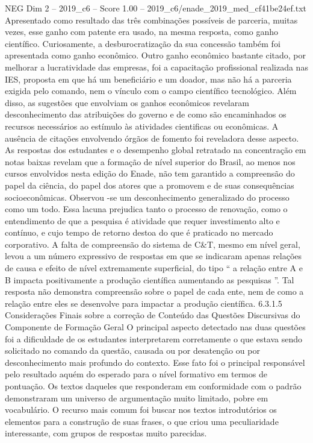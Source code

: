 \begin{textsample}{NEG Dim 2 – 2019\_c6 – Score 1.00 – 2019\_c6/enade\_2019\_med\_cf41be24ef.txt}
Apresentado como resultado das três combinações possíveis de parceria, muitas vezes, esse ganho com patente era usado, na mesma resposta, como ganho científico.
Curiosamente, a desburocratização da sua concessão também foi apresentada como ganho econômico.
Outro ganho econômico bastante citado, por melhorar a lucratividade das empresas, foi a capacitação profissional realizada nas IES, proposta em que há um beneficiário e um doador, mas não há a parceria exigida pelo comando, nem o vínculo com o campo científico tecnológico.
Além disso, as sugestões que envolviam os ganhos econômicos revelaram desconhecimento das atribuições do governo e de como são encaminhados os recursos necessários ao estímulo às atividades cientificas ou econômicas.
A ausência de citações envolvendo órgãos de fomento foi reveladora desse aspecto.
As respostas dos estudantes e o desempenho global retratado na concentração em notas baixas revelam que a formação de nível superior do Brasil, ao menos nos cursos envolvidos nesta edição do Enade, não tem garantido a compreensão do papel da ciência, do papel dos atores que a promovem e de suas consequências socioeconômicas.
Observou -se um desconhecimento generalizado do processo como um todo.
Essa lacuna prejudica tanto o processo de renovação, como o entendimento de que a pesquisa é atividade que requer investimento alto e contínuo, e cujo tempo de retorno destoa do que é praticado no mercado corporativo.
A falta de compreensão do sistema de C\&T, mesmo em nível geral, levou a um número expressivo de respostas em que se indicaram apenas relações de causa e efeito de nível extremamente superficial, do tipo “ a relação entre A e B impacta positivamente a produção científica aumentando as pesquisas ”.
Tal resposta não demonstra compreensão sobre o papel de cada ente, nem de como a relação entre eles se desenvolve para impactar a produção científica. 6.3.1.5 Considerações Finais sobre a correção de Conteúdo das Questões Discursivas do Componente de Formação Geral O principal aspecto detectado nas duas questões foi a dificuldade de os estudantes interpretarem corretamente o que estava sendo solicitado no comando da questão, causada ou por desatenção ou por desconhecimento mais profundo do contexto.
Esse fato foi o principal responsável pelo resultado aquém do esperado para o nível formativo em termos de pontuação.
Os textos daqueles que responderam em conformidade com o padrão demonstraram um universo de argumentação muito limitado, pobre em vocabulário.
O recurso mais comum foi buscar nos textos introdutórios os elementos para a construção de suas frases, o que criou uma peculiaridade interessante, com grupos de respostas muito parecidas.

\end{textsample}
